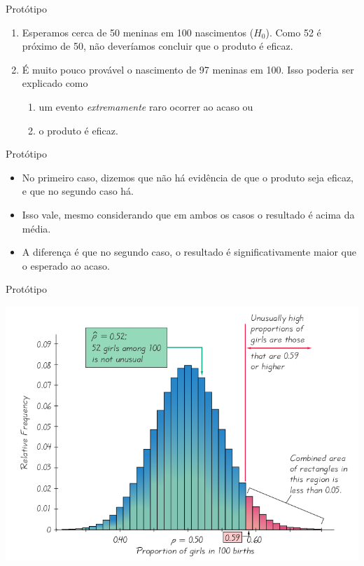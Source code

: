 \documentclass{beamer}
\begin{document}
\begin{frame}{Protótipo}
  \begin{example}
    \begin{enumerate}
    \item Esperamos cerca de 50 meninas em 100 nascimentos
      ($H_0$). Como 52 é próximo de 50, não deveríamos concluir que o
      produto é eficaz.
    \item É muito pouco provável o nascimento de 97 meninas em
      100. Isso poderia ser explicado como
      \begin{enumerate}
      \item um evento {\em extremamente} raro ocorrer ao acaso ou
      \item o produto é eficaz.
      \end{enumerate}
    \end{enumerate}
  \end{example}
\end{frame}

\begin{frame}{Protótipo}
  \begin{itemize}
  \item No primeiro caso, dizemos que não há evidência de que o
    produto seja eficaz, e que no segundo caso há.
  \item Isso vale, mesmo considerando que em ambos os casos o
    resultado é acima da média.
  \item A diferença é que no segundo caso, o resultado é
    \alert{significativamente} maior que o esperado ao acaso.
  \end{itemize}
\end{frame}

\begin{frame}{Protótipo}
  \begin{center}
    \includegraphics[width=\textwidth]{TH_I/regiao_critica1}
  \end{center}
\end{frame}
\end{document}
